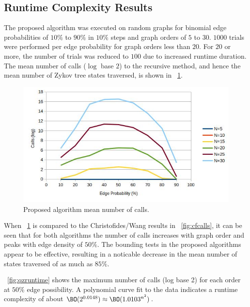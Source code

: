 \subsection{Runtime Complexity Results}\label{sec:sub:runtime}

The proposed algorithm was executed on random graphs for binomial edge probabilities of \(10\%\) to \(90\%\) in
\(10\%\) steps and graph orders of \(5\) to \(30\).  \(1000\) trials were performed per edge probability for graph
orders less than \(20\).  For \(20\) or more, the number of trials was reduced to \(100\) due to increased runtime
duration.  The mean number of calls (\(\log\) base \(2\)) to the recursive method, and hence the mean number of
Zykov tree states traversed, is shown in \figurename~\ref{fig:qzcalls}.

\begin{figure}[H]
  \centering
  \includegraphics[width=5in]{qz_calls}
  \caption{Proposed algorithm mean number of calls.}
  \label{fig:qzcalls}
\end{figure}

When \figurename~\ref{fig:qzcalls} is compared to the Christofides/Wang results in \figurename~\ref{fig:cfcalls},
it can be seen that for both algorithms the number of calls increases with graph order and peaks with edge density
of \(50\%\).  The bounding tests in the proposed algorithms appear to be effective, resulting in a noticable
decrease in the mean number of states traversed of as much as \(85\%\).

\figurename~\ref{fig:qzruntime} shows the maximum number of calls (log base 2) for each order at \(50\%\) edge
possibility.  A polynomial curve fit to the data indicates a runtime complexity of about
\(\BO(2^{0.0148})\approx\BO(1.0103^{n^2})\).

